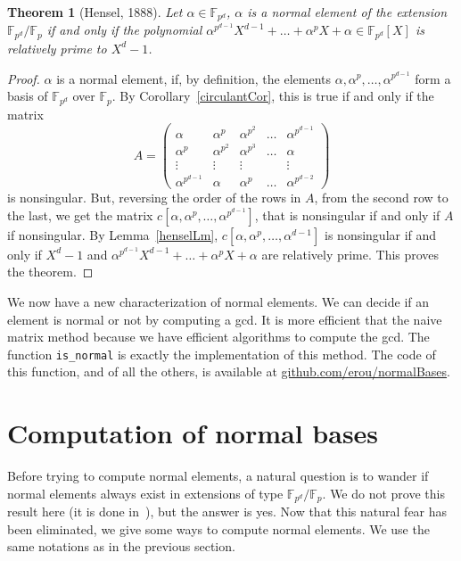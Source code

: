 \documentclass[a4paper,11pt]{article}
\theoremstyle{break}
\newtheorem{thm}{Theorem}[section]
\theoremstyle{sc}
\theoremstyle{definition}
\theoremstyle{remark}
\begin{document}
\begin{thm}[Hensel, 1888]
  \label{hensel}
  Let $\alpha\in\mathbb{F}_{p^d}$, $\alpha$ is a normal element of the
  extension $\mathbb{F}_{p^d}/\mathbb{F}_p$ if and only if the polynomial
  $\alpha^{p^{d-1}}X^{d-1}+\dots+\alpha^pX+\alpha\in\mathbb{F}_{p^d}[X]$ 
  is relatively prime to $X^d-1$.
\end{thm}
\begin{proof}
  $\alpha$ is a normal element, if, by definition, the elements $\alpha,
  \alpha^p, \dots, \alpha^{p^{d-1}}$ form a basis of
  $\mathbb{F}_{p^d}$ over $\mathbb{F}_p$. By
  Corollary~\ref{circulantCor}, this is
  true if and only if the matrix
  \[
    A =
    \begin{pmatrix}
      \alpha & \alpha^p & \alpha^{p^2} & \dots & \alpha^{p^{d-1}} \\
      \alpha^p & \alpha^{p^2} & \alpha^{p^3} & \dots & \alpha \\
      \vdots & \vdots & \vdots & & \vdots \\
      \alpha^{p^{d-1}} & \alpha & \alpha^p & \dots & \alpha^{p^{d-2}}
    \end{pmatrix}
  \]
  is nonsingular. But, reversing the order of the rows in $A$, from the second
  row to the last, we get the matrix $c[\alpha, \alpha^p, \dots,
  \alpha^{p^{d-1}}]$, that is nonsingular if and only if $A$ if
  nonsingular. By Lemma~\ref{henselLm}, $c[\alpha, \alpha^p, \dots,
  \alpha^{d-1}]$ is nonsingular if and only if $X^d-1$ and
  $\alpha^{p^{d-1}}X^{d-1}+\dots+\alpha^pX+\alpha$ are relatively prime.
  This proves the theorem.
\end{proof}
We now have a new characterization of normal elements. We can decide if an
element is normal or not by computing a gcd. It is more efficient that the
naive matrix method because we have efficient algorithms to compute the gcd.
The function \texttt{is\_normal} is exactly the implementation of this
method. The code of this function, and of all the others, is available at
\url{github.com/erou/normalBases}.

\section{Computation of normal bases}
Before trying to compute normal elements, a natural question is to wander if
normal elements always exist in extensions of type
$\mathbb{F}_{p^{d}}/\mathbb{F}_p$. We do not prove this result here (it is done
in~\cite{Ga93}), but the answer is yes. Now that this natural fear has been
eliminated, we give some ways to compute normal elements. We use the same
notations as in the previous section.
\end{document}
